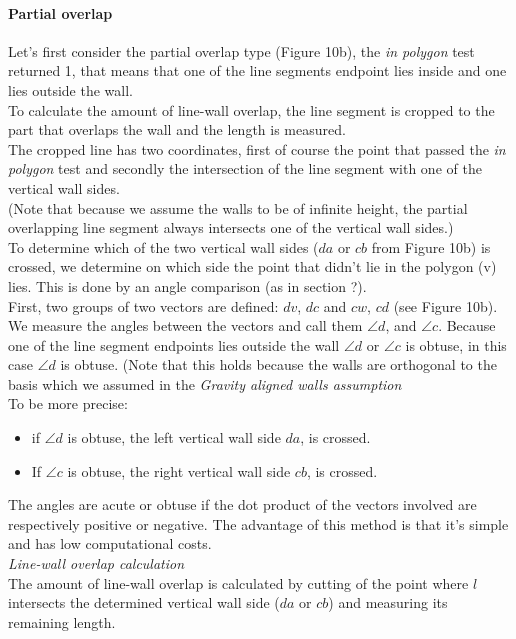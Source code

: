 \documentclass[10pt]{article}
\begin{document}
	\paragraph{Partial overlap}
	Let's first consider the partial overlap type (Figure 10b), the \emph{in polygon} test
	returned 1, that means that one of the line segments endpoint lies inside
	and one lies outside the wall.\\
	To calculate the amount of line-wall overlap, the line segment is cropped to the
	part that overlaps the wall and the length is measured.\\
	The cropped line has two coordinates, first of course the point that passed
	the \emph{in polygon} test and secondly the intersection of the line
	segment with one of the vertical wall sides.\\
	(Note that because we assume the walls to be of infinite height, the 
	partial overlapping line segment always intersects one of the
	vertical wall sides.)\\
	To determine which of the two vertical wall sides ($da$ or $cb$ from Figure 10b)
	 is crossed, we determine on which side the point that didn't lie in the polygon (v) lies.
	This is done by an angle comparison (as in section ?).\\
	First, two groups of two vectors are defined: $dv$, $dc$ and $cw$, $cd$ (see Figure 10b).
	We measure the angles between the vectors and call them $\angle d$, and
	$\angle c$. 
	Because one of the line segment endpoints lies outside
	the wall $\angle d$ or $\angle c$ is obtuse, in this case $\angle d$ is obtuse.
	(Note that this holds because the walls are orthogonal to the basis
	which we assumed in the \emph{Gravity aligned walls assumption}\\
	To be more precise: 
	\begin{itemize}
	\item if $\angle d$ is obtuse, the left vertical wall side $da$, is
	crossed. \\
	\item If $\angle c$ is obtuse, the right vertical wall side $cb$, is
	crossed. \\
	\end{itemize}
	The angles are acute or obtuse if the dot product of the vectors involved
	are respectively positive or negative. The advantage of this method is that
	it's simple and has low computational costs.\\
	
	\emph{Line-wall overlap calculation}\\
	The amount of line-wall overlap is calculated by cutting of the
	point where $l$ intersects the determined vertical wall side ($da$ or
	$cb$) and measuring its remaining length.\\
\end{document}
